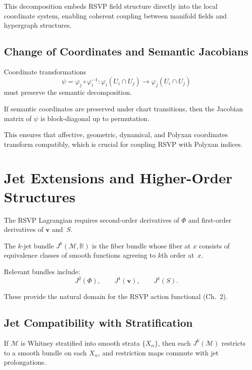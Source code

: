 This decomposition embeds RSVP field structure directly into the local
coordinate system, enabling coherent coupling between manifold fields and
hypergraph structures.

\subsection{Change of Coordinates and Semantic Jacobians}

Coordinate transformations
\[
\psi = \varphi_j \circ \varphi_i^{-1} : \varphi_i(U_i \cap U_j)
\to \varphi_j(U_i \cap U_j)
\]
must preserve the semantic decomposition.

\begin{proposition}
If semantic coordinates are preserved under chart transitions, then the Jacobian
matrix of $\psi$ is block-diagonal up to permutation.
\end{proposition}

This ensures that affective, geometric, dynamical, and Polyxan coordinates
transform compatibly, which is crucial for coupling RSVP with Polyxan indices.

\section{Jet Extensions and Higher-Order Structures}

The RSVP Lagrangian requires second-order derivatives of $\Phi$ and first-order
derivatives of $\mathbf{v}$ and~$S$.

\begin{definition}
The $k$-jet bundle $J^k(\mathcal{M},\mathbb{R})$ is the fiber bundle whose fiber
at $x$ consists of equivalence classes of smooth functions agreeing to
$k$th order at~$x$.
\end{definition}

Relevant bundles include:
\[
J^2(\Phi),
\qquad
J^1(\mathbf{v}),
\qquad
J^1(S).
\]

These provide the natural domain for the RSVP action functional (Ch.~2).

\subsection{Jet Compatibility with Stratification}

\begin{lemma}
If $\mathcal{M}$ is Whitney stratified into smooth strata $\{X_\alpha\}$, then
each $J^k(\mathcal{M})$ restricts to a smooth bundle on each $X_\alpha$, and
restriction maps commute with jet prolongations.
\end{lemma}

